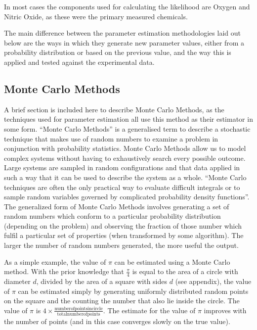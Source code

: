 In most cases the components used for calculating the likelihood are Oxygen and Nitric Oxide, as these were the primary measured chemicals.

The main difference between the parameter estimation methodologies laid out below are the ways in which they generate new parameter values, either from a probability distribution or based on the previous value, and the way this is applied and tested against the experimental data.

\subsection*{Monte Carlo Methods}

A brief section is included here to describe Monte Carlo Methods, as the techniques used for parameter estimation all use this method as their estimator in some form.
``Monte Carlo Methods'' is a generalised term to describe a stochastic technique that makes use of random numbers to examine a problem in conjunction with probability statistics. Monte Carlo Methods allow us to model complex systems without having to exhaustively search every possible outcome. Large systems are sampled in random configurations and that data applied in such a way that it can be used to describe the system as a whole. ``Monte Carlo techniques are often the only practical way to evaluate difficult integrals or to sample random variables governed by complicated probability density functions''\cite{Nakamura2010}. The generalized form of Monte Carlo Methods involves generating a set of random numbers which conform to a particular probability distribution (depending on the problem) and observing the fraction of those number which fulfil a particular set of properties (when transformed by some algorithm). The larger the number of random numbers generated, the more useful the output.

As a simple example, the value of $\pi$ can be estimated using a Monte Carlo method. With the prior knowledge that $\frac{\pi}{4}$ is equal to the area of a circle with diameter $d$, divided by the area of a square with sides $d$ (see appendix), the value of $\pi$ can be estimated simply by generating uniformly distributed random points on the square and the counting the number that also lie inside the circle. The value of $\pi$ is $4\times\frac{\mathrm{number of points in circle}}{\mathrm{total number of points}}$. The estimate for the value of $\pi$ improves with the number of points (and in this case converges slowly on the true value).

